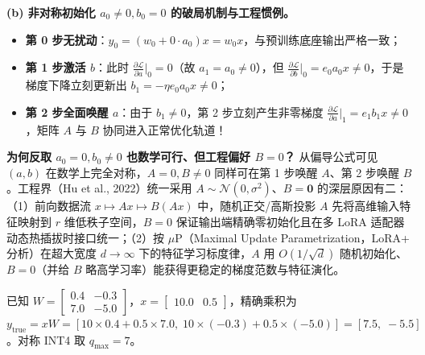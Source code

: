 \textbf{(b) 非对称初始化 $a_0 \neq 0, b_0 = 0$ 的破局机制与工程惯例。}
\begin{itemize}
  \item \textbf{第 0 步无扰动}：$y_0 = (w_0 + 0 \cdot a_0)x = w_0 x$，与预训练底座输出严格一致；
  \item \textbf{第 1 步激活 $b$}：此时 $\frac{\partial \mathcal{L}}{\partial a}\big|_0 = 0$（故 $a_1 = a_0 \neq 0$），但 $\frac{\partial \mathcal{L}}{\partial b}\big|_0 = e_0 a_0 x \neq 0$，于是梯度下降立刻更新出 $b_1 = -\eta e_0 a_0 x \neq 0$；
  \item \textbf{第 2 步全面唤醒 $a$}：由于 $b_1 \neq 0$，第 2 步立刻产生非零梯度 $\frac{\partial \mathcal{L}}{\partial a}\big|_1 = e_1 b_1 x \neq 0$，矩阵 $A$ 与 $B$ 协同进入正常优化轨道！
\end{itemize}
\textbf{为何反取 $a_0 = 0, b_0 \neq 0$ 也数学可行、但工程偏好 $B = 0$？} 从偏导公式可见 $(a, b)$ 在数学上完全对称，$A = 0, B \neq 0$ 同样可在第 1 步唤醒 $A$、第 2 步唤醒 $B$。工程界（Hu et al., 2022）统一采用 $A \sim \mathcal{N}(0, \sigma^2)$、$B = \mathbf{0}$ 的深层原因有二：（1）前向数据流 $x \mapsto A x \mapsto B(Ax)$ 中，随机正交/高斯投影 $A$ 先将高维输入特征映射到 $r$ 维低秩子空间，$B = 0$ 保证输出端精确零初始化且在多 LoRA 适配器动态热插拔时接口统一；（2）按 $\mu$P（Maximal Update Parametrization，LoRA+ 分析）在超大宽度 $d \to \infty$ 下的特征学习标度律，$A$ 用 $O(1/\sqrt{d})$ 随机初始化、$B = 0$（并给 $B$ 略高学习率）能获得更稳定的梯度范数与特征演化。


已知 $W = \begin{bmatrix} 0.4 & -0.3 \\ 7.0 & -5.0 \end{bmatrix}$，$x = \begin{bmatrix} 10.0 & 0.5 \end{bmatrix}$，精确乘积为 $y_{\mathrm{true}} = x W = [10\times 0.4 + 0.5\times 7.0,\; 10\times(-0.3) + 0.5\times(-5.0)] = \mathbf{[7.5,\; -5.5]}$。对称 INT4 取 $q_{\max} = 7$。


